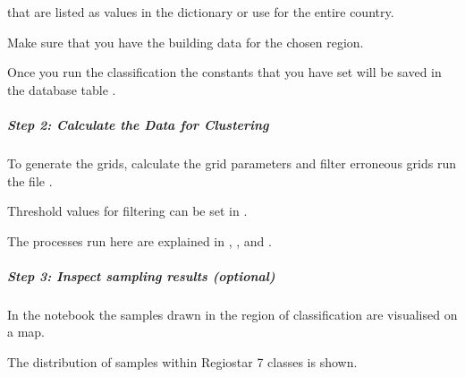 \documentclass[letterpaper,10pt,english]{sphinxmanual}
\let\sphinxpxdimen\pdfpxdimen\else\newdimen\sphinxpxdimen
\begin{document}
\begin{DUlineblock}{0em}
\item[] that are listed as values in the dictionary or use  for the entire country.
\item[] Make sure that you have the building data for the chosen region.
\end{DUlineblock}

\sphinxAtStartPar
Once you run the classification the constants that you have set will be saved
in the database table .


\subparagraph{Step 2: Calculate the Data for Clustering}
\label{\detokenize{classification/usage/usage:step-2-calculate-the-data-for-clustering}}
\begin{DUlineblock}{0em}
\item[] To generate the grids, calculate the grid parameters and filter erroneous grids run the file .
\end{DUlineblock}

\sphinxAtStartPar
Threshold values for filtering can be set in .

\sphinxAtStartPar
The processes run here are explained in {\hyperref[\detokenize{classification/classification_steps/sampling::doc}]{}},
{\hyperref[\detokenize{classification/classification_steps/grid_generation_for_classification::doc}]{}},
{\hyperref[\detokenize{classification/classification_steps/parameters::doc}]{}} and
{\hyperref[\detokenize{classification/classification_steps/filter_grids::doc}]{}}.


\subparagraph{Step 3: Inspect sampling results (optional)}
\label{\detokenize{classification/usage/usage:step-3-inspect-sampling-results-optional}}
\sphinxAtStartPar
In the notebook  the samples drawn in the region of classification
are visualised on a map.

\noindent\sphinxincludegraphics[width=400\sphinxpxdimen]{{karte_samples2}.png}

\sphinxAtStartPar
The distribution of samples within Regiostar 7 classes is shown.
\end{document}
